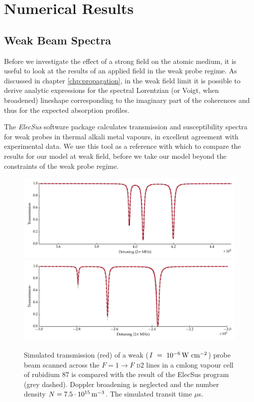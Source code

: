 \section{Numerical Results}
  \label{sec:twophoton_results}

  \subsection{Weak Beam Spectra}

    Before we investigate the effect of a strong field on the atomic medium, it
    is useful to look at the results of an applied field in the weak probe
    regime. As discussed in chapter \ref{chp:propagation}, in the weak field
    limit it is possible to derive analytic expressions for the spectral
    Lorentzian (or Voigt, when broadened)  lineshape corresponding to the
    imaginary part of the coherences and thus for the expected absorption
    profiles.

    The \textit{ElecSus} software package\cite{Zentile2015} calculates
    transmission and susceptibility spectra for weak probes in thermal alkali
    metal vapours, in excellent agreement with experimental
    data.\cite{Siddons2008,Weller2011} We use this tool as a reference with
    which to compare the results for our model at weak field, before we take our
    model beyond the constraints of the weak probe regime.

    \begin{figure}[]
    \includegraphics[width=\linewidth]
        {figs/05_twophoton/rb87_d2_hf_solve_scan_g2a_fig3.pdf}
    \includegraphics[width=\linewidth]
        {figs/05_twophoton/rb87_d2_hf_solve_scan_h1a_fig3.pdf}
    \caption{
    Simulated transmission (red) of a weak ($I~=~\unit[10^{-6}]{W~cm^{-2}}$)
    probe beam scanned across the  $F = 1 \rightarrow F$ \textsc{d2} lines in a
    \unit[1]{cm}long vapour cell of rubidium 87 is compared with the result of
    the ElecSus program (grey dashed). Doppler broadening is neglected and the
    number density $N = \unit[7.5\cdot10^{15}]{m^{-3}}$. The simulated transit
    time \unit[2]{$\mu$s}.
    }
    \label{fig:weak_d2} 
    \end{figure}

